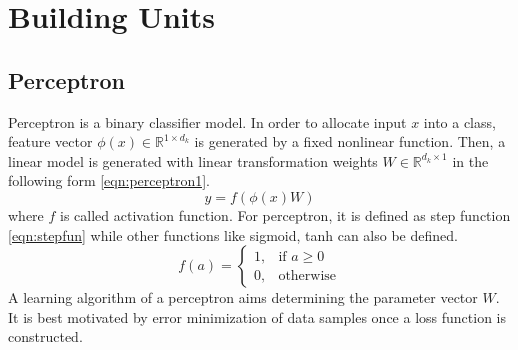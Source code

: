\section{Building Units}
\label{sec:building_units}
\subsection{Perceptron}
Perceptron is a binary classifier model. In order to allocate input $x$ into a class, feature vector $\phi(x) \in \mathbb{R}^{1 \times d_k}$ is generated by a fixed nonlinear function. Then, a linear model is generated with linear transformation weights $W \in \mathbb{R}^{d_k \times 1} $ in the following form \ref{eqn:perceptron1}. \\
\begin{equation}
\label{eqn:perceptron1}
y = f(\phi(x) W)
\end{equation}
where $f$ is called activation function. For perceptron, it is defined as step function \ref{eqn:stepfun} while other functions like sigmoid, tanh can also be defined. \\
\begin{equation}
\label{eqn:stepfun}
f(a) = 
\begin{cases}
1,   & \text{if } a\geq 0\\
0,   & \text{otherwise}
\end{cases} 
\end{equation}
A learning algorithm of a perceptron aims determining the parameter vector $W$. It is best motivated by error minimization of data samples once a loss function is constructed. \\
